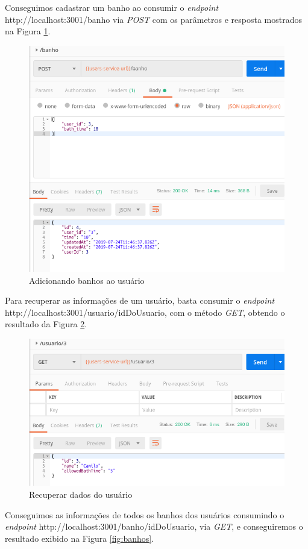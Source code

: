 Conseguimos cadastrar um banho ao consumir o \textit{endpoint} http://localhost:3001/banho via \textit{POST} com os parâmetros e resposta mostrados na Figura \ref{fig:banho}.

\begin{figure}[htbp]
	\centering
	\includegraphics[width=0.7\linewidth]{figuras/postman/bathsinclude.png}
	\caption{Adicionando banhos ao usuário}
	\label{fig:banho}
\end{figure}

Para recuperar as informações de um usuário, basta consumir o \textit{endpoint} \break http://localhost:3001/usuario/idDoUsuario, com o método \textit{GET}, obtendo o resultado da Figura \ref{fig:usuario}.

\begin{figure}[htbp]
	\centering
	\includegraphics[width=0.7\linewidth]{figuras/postman/getuser.png}
	\caption{Recuperar dados do usuário}
	\label{fig:usuario}
\end{figure}

Conseguimos as informações de todos os banhos dos usuários consumindo o \textit{endpoint} http://localhost:3001/banho/idDoUsuario, via \textit{GET}, e conseguiremos o resultado exibido na Figura \ref{fig:banhos}.

